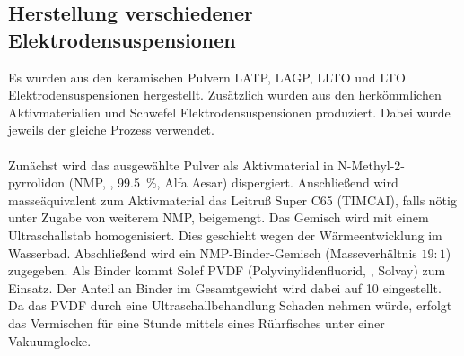 \documentclass[a4paper, 11pt, headsepline,footsepline,twoside,abstract]{scrbook}
\begin{document}
\subsection{Herstellung verschiedener Elektrodensuspensionen}
Es wurden aus den keramischen Pulvern LATP, LAGP, LLTO und LTO  Elektrodensuspensionen hergestellt. Zusätzlich wurden aus den herkömmlichen Aktivmaterialien  und Schwefel Elektrodensuspensionen produziert. Dabei wurde jeweils der gleiche Prozess verwendet. 
\\\\
Zunächst wird das ausgewählte Pulver als Aktivmaterial in N-Methyl-2-pyrrolidon (NMP, , \SI{99.5}{\percent}, Alfa Aesar) dispergiert. Anschließend wird masseäquivalent zum Aktivmaterial das Leitruß Super C65 (TIMCAI), falls nötig unter Zugabe von weiterem NMP, beigemengt. Das Gemisch wird mit einem Ultraschallstab homogenisiert. Dies geschieht wegen der Wärmeentwicklung im Wasserbad. Abschließend wird ein NMP-Binder-Gemisch (Masseverhältnis $19:1$) zugegeben. Als Binder kommt Solef PVDF (Polyvinylidenfluorid, , Solvay) zum Einsatz. Der Anteil an Binder im Gesamtgewicht wird dabei auf \SI{10}{\masspercent} eingestellt. Da das PVDF durch eine Ultraschallbehandlung Schaden nehmen würde, erfolgt das Vermischen für eine Stunde mittels eines Rührfisches unter einer Vakuumglocke.
\end{document}
